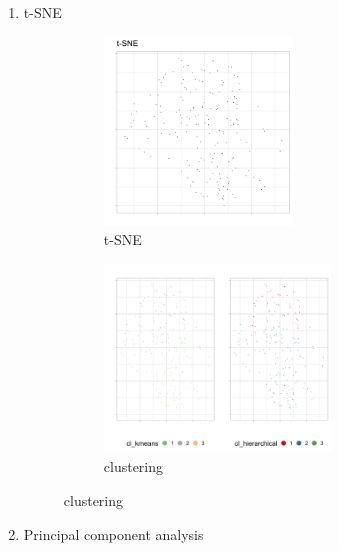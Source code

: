 \documentclass{article}
\begin{document}
\begin{enumerate}
    \item t-SNE
    
    \begin{figure}[H]
    
        \begin{subfigure}{0.5\textwidth}
        \includegraphics[width = 0.9\linewidth, height = 5cm]{Image/t-SNE.jpg}
        \caption{t-SNE}
        \end{subfigure}
        \begin{subfigure}{0.5\textwidth}
        \includegraphics[width = 0.9\linewidth, height = 5cm]{Image/cluster.jpg}
        \caption{clustering}
        \end{subfigure}
        
    \end{figure}
    
    \item Principal component analysis
    
    \begin{figure}[H]
        

\end{figure}
\end{enumerate}
\end{document}
